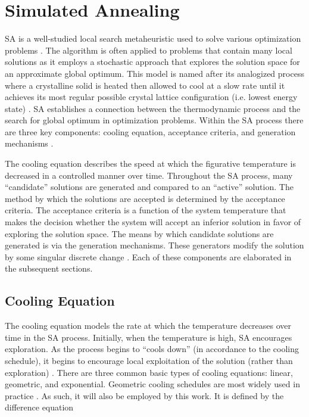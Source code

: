 \documentclass[energies,article,submit,moreauthors]{Definitions/mdpi}
\begin{document}
\section{Simulated Annealing}
\label{sec:sa-simulated-annealing}
SA is a well-studied local search metaheuristic used to solve various optimization problems
\cite{gendreau-2018-handb-metah,press-1992-numer-recip}. The algorithm is often applied to problems that contain many
local solutions as it employs a stochastic approach that explores the solution space for an approximate global optimum.
This model is named after its analogized process where a crystalline solid is heated then allowed to cool at a slow rate
until it achieves its most regular possible crystal lattice configuration (i.e. lowest energy state)
\cite{henderson-1989-theor-pract,press-1992-numer-recip}. SA establishes a connection between the thermodynamic
process and the search for global optimum in optimization problems. Within the SA process there are three key
components: cooling equation, acceptance criteria, and generation mechanisms
\cite{keller-2019-multi-objec,press-1992-numer-recip}.

The cooling equation describes the speed at which the figurative temperature is decreased in a controlled manner over
time. Throughout the SA process, many ``candidate'' solutions are generated and compared to an ``active'' solution. The
method by which the solutions are accepted is determined by the acceptance criteria. The acceptance criteria is a
function of the system temperature that makes the decision whether the system will accept an inferior solution in favor
of exploring the solution space. The means by which candidate solutions are generated is via the generation mechanisms.
These generators modify the solution by some singular discrete change \cite{gendreau-2018-handb-metah}. Each of these
components are elaborated in the subsequent sections.

\subsection{Cooling Equation}
\label{cooling-equation-experimental}
The cooling equation models the rate at which the temperature decreases over time in the SA process. Initially, when the
temperature is high, SA encourages exploration. As the process begins to ``cools down'' (in accordance to the cooling
schedule), it begins to encourage local exploitation of the solution (rather than exploration)
\cite{rutenbar-1989-simul-anneal-algor,henderson-1989-theor-pract}. There are three common basic types of cooling
equations: linear, geometric, and exponential. Geometric cooling schedules are most widely used in practice
\cite{keller-2019-multi-objec}. As such, it will also be employed by this work. It is defined by the difference
equation
\end{document}
